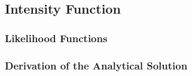\subsection{Intensity Function}
\label{sec:Method:IntensityFunc}


\subsubsection{Likelihood Functions}
\label{sec:Method:IntensityFunc:LikelihoodFunc}


\subsubsection{Derivation of the Analytical Solution}
\label{sec:Method:IntensityFunc:DerivationAnalytical}





